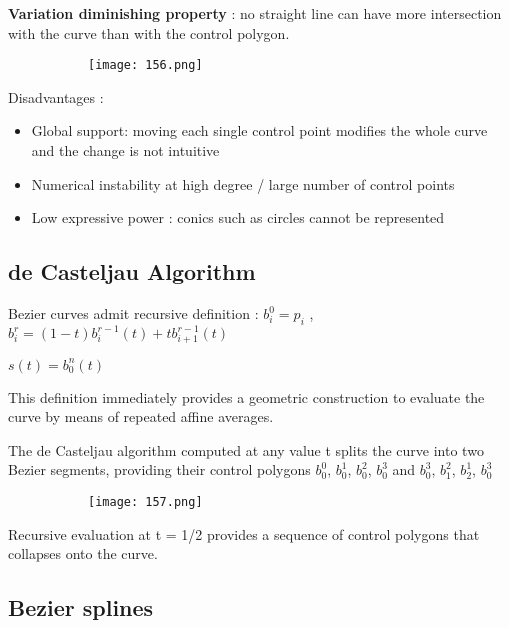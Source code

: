 \documentclass{article}
\begin{document}
\textbf{Variation diminishing property} : no straight line can have more intersection with the curve than with the control polygon.

    \begin{figure}[ht!]
  \centering
  \begin{subfigure}[b]{0.8\linewidth}
    \texttt{[image: 156.png]}
  \end{subfigure}
\end{figure}

Disadvantages : 

\begin{itemize}
    \item Global support: moving each single control point modifies the whole curve and the change is not intuitive
    \item Numerical instability at high degree / large number of control points
    \item Low expressive power : conics such as circles cannot be represented
\end{itemize}

\subsection{de Casteljau Algorithm}

Bezier curves admit recursive definition : $b_i^0 = p_i$ , $b_i^r = (1-t)b_i^{r-1}(t) + tb_{i+1}^{r-1}(t)$

$s(t) = b_0^n(t)$

This definition immediately provides a geometric construction to evaluate the curve by means of repeated affine averages.

The de Casteljau algorithm computed at any value t splits the curve into two Bezier segments, providing their control polygons $b_0^0$, $b_0^1$, $b_0^2$, $b_0^3$ and  $b_0^3$, $b_1^2$, $b_2^1$, $b_0^3$

    \begin{figure}[ht!]
  \centering
  \begin{subfigure}[b]{0.5\linewidth}
    \texttt{[image: 157.png]}
  \end{subfigure}
\end{figure}

Recursive evaluation at t = 1/2 provides a sequence of control polygons that collapses onto the curve.

\subsection{Bezier splines}
\end{document}
